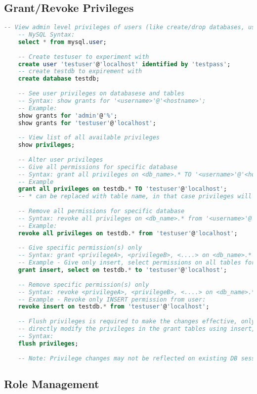 \subsection{Grant/Revoke Privileges}
\begin{lstlisting}[language=SQL]
	-- View admin level privileges of users (like create/drop databases, users etc)
	-- NySQL Syntax:
	select * from mysql.user;
	
	-- Create testuser to experiment with
	create user 'testuser'@'localhost' identified by 'testpass';
	-- create testdb to expirement with
	create database testdb;
	
	-- See user privileges on databasese and tables
	-- Syntax: show grants for '<username>'@'<hostname>';
	-- Example:
	show grants for 'admin'@'%';
	show grants for 'testuser'@'localhost';
	
	-- View list of all available privileges
	show privileges;
	
	-- Alter user privileges
	-- Give all permissions for specific database
	-- Syntax: grant all privileges on <db_name>.* TO '<username>'@'<hostname>';
	-- Example
	grant all privileges on testdb.* TO 'testuser'@'localhost';
	-- * can be replaced with table name, in that case privileges will be granted on table level and not on db
	
	-- Remove all permissions for specific database
	-- Syntax: revoke all privileges on <db_name>.* from '<username>'@'<hostname>';
	-- Example:
	revoke all privileges on testdb.* from 'testuser'@'localhost';
	
	-- Give specific permission(s) only 
	-- Syntax: grant <privilegeA>, <privilegeB>, <....> on <db_name>.* to '<username>'@'<hostname>';
	-- Example - Give only insert, select permissions on all tables for DB:
	grant insert, select on testdb.* to 'testuser'@'localhost';
	
	-- Remove specific permission(s) only
	-- Syntax: revoke <privilegeA>, <privilegeB>, <....> on <db_name>.* from '<username>'@'<hostname>';
	-- Example - Revoke only INSERT permission from user:
	revoke insert on testdb.* from 'testuser'@'localhost';
	
	-- Flush privileges is required to make the changes effective, only when we
	-- directly modify the privileges in the grant tables using insert, update, delete.
	-- Syntax:
	flush privileges;
	
	-- Note: Privilege changes may not be reflected on existing DB sessions.
\end{lstlisting}
\subsection{Role Management}
